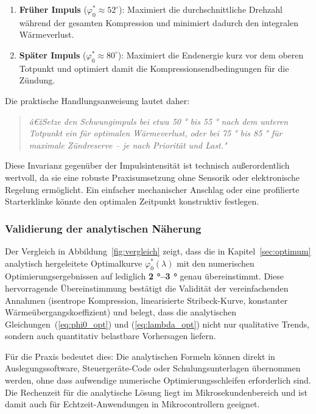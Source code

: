﻿\documentclass[a4paper,12pt]{article}
\begin{document}
\begin{enumerate}
  \item \textbf{Früher Impuls} ($\varphi_0^* \approx 52^\circ$): Maximiert
    die durchschnittliche Drehzahl während der gesamten Kompression und
    minimiert dadurch den integralen Wärmeverlust.
  \item \textbf{Später Impuls} ($\varphi_0^* \approx 80^\circ$): Maximiert
    die Endenergie kurz vor dem oberen Totpunkt und optimiert damit die
    Kompressionsendbedingungen für die Zündung.
\end{enumerate}

Die praktische Handlungsanweisung lautet daher:

\begin{quote}
  \textit{â€žSetze den Schwungimpuls bei etwa 50 ° bis 55 ° nach dem unteren
  Totpunkt ein für optimalen Wärmeverlust, oder bei 75 ° bis 85 ° für
  maximale Zündreserve -- je nach Priorität und Last."}
\end{quote}

Diese Invarianz gegenüber der Impulsintensität ist technisch außerordentlich
wertvoll, da sie eine robuste Praxisumsetzung ohne Sensorik oder elektronische
Regelung ermöglicht. Ein einfacher mechanischer Anschlag oder eine profilierte
Starterklinke könnte den optimalen Zeitpunkt konstruktiv festlegen.

\subsubsection*{Validierung der analytischen Näherung}

Der Vergleich in Abbildung~\ref{fig:vergleich} zeigt, dass die in
Kapitel~\ref{sec:optimum} analytisch hergeleitete Optimalkurve
$\varphi_0^*(\lambda)$ mit den numerischen Optimierungsergebnissen auf
lediglich \textbf{2 °--3 °} genau übereinstimmt. Diese hervorragende Übereinstimmung
bestätigt die Validität der vereinfachenden Annahmen (isentrope Kompression,
linearisierte Stribeck-Kurve, konstanter Wärmeübergangskoeffizient) und
belegt, dass die analytischen Gleichungen~(\ref{eq:phi0_opt}) und
(\ref{eq:lambda_opt}) nicht nur qualitative Trends, sondern auch quantitativ
belastbare Vorhersagen liefern.

Für die Praxis bedeutet dies: Die analytischen Formeln können direkt in
Auslegungssoftware, Steuergeräte-Code oder Schulungsunterlagen übernommen
werden, ohne dass aufwendige numerische Optimierungsschleifen erforderlich sind.
Die Rechenzeit für die analytische Lösung liegt im Mikrosekundenbereich und
ist damit auch für Echtzeit-Anwendungen in Mikrocontrollern geeignet.
\end{document}
